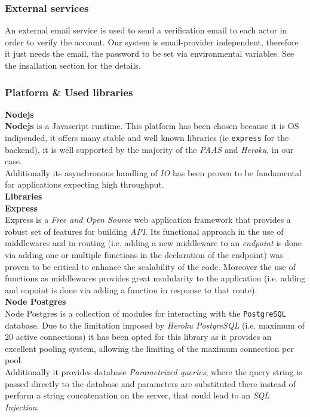 \subsubsection{External services}
An external email service is used to send a verification email to each actor in order to verify the account.
Our system is email-provider independent, therefore it just needs the email, the password to be set via environmental variables.
See the insallation section for the details.

\subsubsection{Platform \& Used libraries}
\textbf{Nodejs}\\
\textbf{Nodejs} is a Javascript runtime.
This platform has been chosen because it is OS indipended, it offers many stable and well known libraries (ie \texttt{express} for the backend), it is well supported by the majority of the \textit{PAAS} and \textit{Heroku}, in our case. \\ Additionally its asynchronous handling of \textit{IO} has been proven to be fundamental for applications expecting high throughput. 
\vspace{1em} \\
\noindent \textbf{Libraries}\\
\textbf{Express} \\
Express is a \textit{Free and Open Source} web application framework that provides a robust set of features for building \textit{API}. Its functional approach in the use of middlewares and in routing (i.e. adding a new middleware to an \textit{endpoint} is done via adding one or multiple functions in the declaration of the endpoint) was proven to be critical to enhance the scalability of the code. Moreover the use of functions as middlewares provides great modularity to the application (i.e. adding and enpoint is done via adding a function in response to that route).
\vspace{0.5em}
\\
\textbf{Node Postgres} \\
Node Postgres is a collection of modules for interacting with the \texttt{PostgreSQL} database.
Due to the limitation imposed by \textit{Heroku PostgreSQL} (i.e. maximum of 20 active connections) it has been opted for this library as it provides an excellent pooling system, allowing the limiting of the maximum connection per pool. \\ Additionally it provides database \textit{Parametrized queries}, where the query string is passed directly to the database and parameters are substituted there instead of perform a string concatenation on the server, that could lead to an \textit{SQL Injection}.
